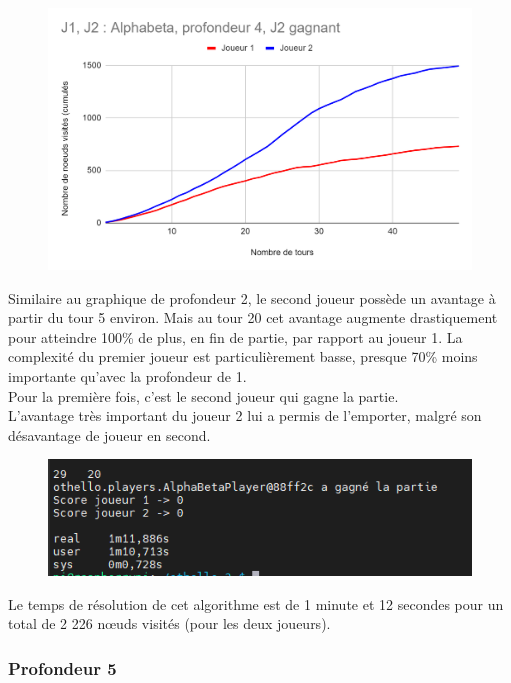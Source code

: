 \documentclass[12pt]{article}
\begin{document}
\begin{figure}[!h]
   \includegraphics[width=\textwidth]{prof4alphabeta.png}
\end{figure}

Similaire au graphique de profondeur 2, le second joueur possède un avantage à partir du tour 5 environ. Mais au tour 20 cet avantage augmente drastiquement pour atteindre 100\% de plus, en fin de partie, par rapport au joueur 1. La complexité du premier joueur est particulièrement basse, presque 70\% moins importante qu’avec la profondeur de 1.\\
Pour la première fois, c’est le second joueur qui gagne la partie.\\
L’avantage très important du joueur 2 lui a permis de l’emporter, malgré son désavantage de joueur en second.\\

\begin{figure}[!h]
   \includegraphics[width=\textwidth]{prof4alphabeta-console.png}
\end{figure}

Le temps de résolution de cet algorithme est de 1 minute et 12 secondes pour un total de 2 226 nœuds visités (pour les deux joueurs).

\subsubsection{Profondeur 5}
\end{document}
